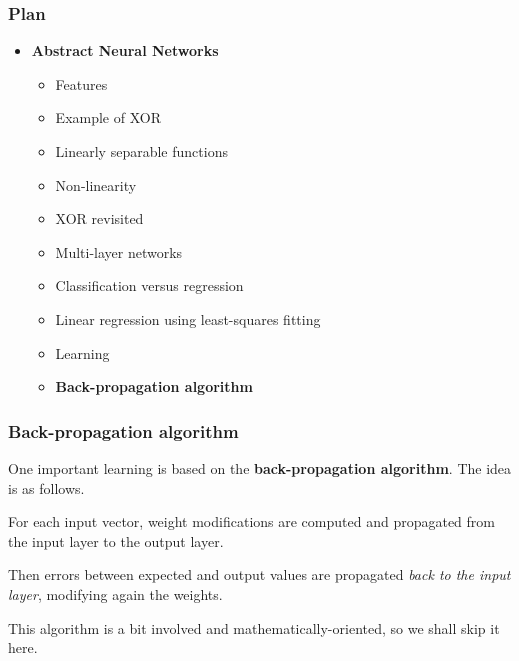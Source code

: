%
\begin{frame}
\frametitle{Plan}

\begin{itemize}

  \item \textbf{Abstract Neural Networks}

  \begin{itemize}

    \item Features

    \item Example of XOR

    \item Linearly separable functions

    \item Non-linearity

    \item XOR revisited

    \item Multi-layer networks

    \item Classification versus regression

    \item Linear regression using least-squares fitting

    \item Learning

    \item \textbf{Back-propagation algorithm}

  \end{itemize}

\end{itemize}

\end{frame}

%
\begin{frame}
\frametitle{Back-propagation algorithm}

One important learning is based on the \textbf{back-propagation
algorithm}. The idea is as follows. 

\bigskip

For each input vector, weight modifications are computed and
propagated from the input layer to the output layer.

\bigskip

Then errors between expected and output values are propagated
\emph{back to the input layer}, modifying again the weights.

\bigskip

This algorithm is a bit involved and mathematically-oriented, so we
shall skip it here.

\end{frame}

